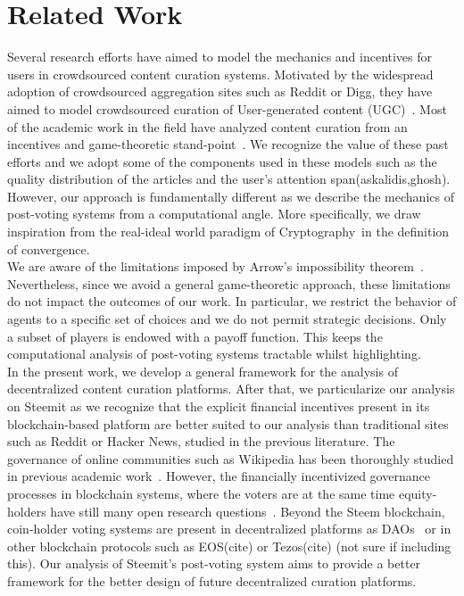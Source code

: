 \section{Related Work}
  Several research efforts have aimed to model the mechanics and incentives for users in crowdsourced content curation systems. Motivated by the widespread adoption of crowdsourced aggregation sites such as Reddit or Digg, they have aimed to model crowdsourced curation of User-generated content (UGC)~\cite{askalidis2013theoretical}. Most of the academic work in the field have analyzed content curation from an incentives and game-theoretic stand-point~\cite{ghosh2011incentivizing,das2010ranking,gupte2009news}. We recognize the value of these past efforts and we adopt some of the components used in these models such as the quality distribution of the articles and the user's attention span(askalidis,ghosh). However, our approach is fundamentally different as we describe the mechanics of post-voting systems from a computational angle. More specifically, we draw inspiration from the real-ideal world paradigm of Cryptography~\cite{lindell}in the definition of convergence.\\
  
  We are aware of the limitations imposed by Arrow's impossibility theorem~\cite{arrow1950difficulty}. Nevertheless, since we avoid a general game-theoretic approach, these limitations do not impact the outcomes of our work. In particular, we restrict the behavior of agents to a specific set of choices and we do not permit strategic decisions. Only a subset of players is endowed with a payoff function. This keeps the computational analysis of post-voting systems tractable whilst highlighting.\\

  
  In the present work, we develop a general framework for the analysis of decentralized content curation platforms. After that, we particularize our analysis on Steemit as we recognize that the explicit financial incentives present in its blockchain-based platform are better suited to our analysis than traditional sites such as Reddit or Hacker News, studied in the previous literature. The governance of online communities such as Wikipedia has been thoroughly studied in previous academic work~\cite{leskovec2010governance,forte2008scaling}. However, the financially incentivized governance processes in blockchain systems, where the voters are at the same time equity-holders have still many open research questions~\cite{vitalik, ehrsam}. Beyond the Steem blockchain, coin-holder voting systems are present in decentralized platforms as DAOs~\cite{darkdaos} or in other blockchain protocols such as EOS(cite) or Tezos(cite) (not sure if including this). Our analysis of Steemit's post-voting system aims to provide a better framework for the better design of future decentralized curation platforms.
  
  
